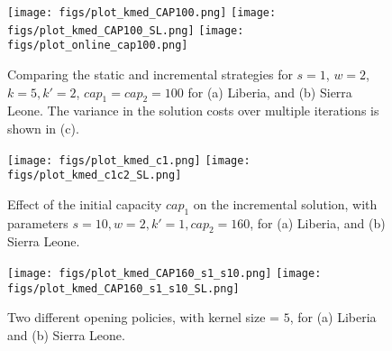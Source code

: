 \begin{figure}[h]
  \centering %
    \texttt{[image: figs/plot\_kmed\_CAP100.png]}
    \texttt{[image: figs/plot\_kmed\_CAP100\_SL.png]}
    \texttt{[image: figs/plot\_online\_cap100.png]}
    \caption{Comparing the static and incremental strategies for
$s=1$, $w=2$, $k=5, k' = 2$, $cap_1 = cap_2 = 100$ for
(a) Liberia, and (b) Sierra Leone.
The variance in the solution costs over multiple iterations is shown in (c).}
\label{fig:online1}
\end{figure}

\begin{figure}[h]
  \centering %
    \texttt{[image: figs/plot\_kmed\_c1.png]}
    \texttt{[image: figs/plot\_kmed\_c1c2\_SL.png]}
    \caption{Effect of the initial capacity $cap_1$ on the incremental solution, with
parameters $s = 10, w = 2, k' = 1, cap_2 = 160$, for (a) Liberia, and (b) Sierra Leone.}
\label{fig:online2}
\end{figure}

\begin{figure}[h]
  \centering %
    \texttt{[image: figs/plot\_kmed\_CAP160\_s1\_s10.png]}
    \texttt{[image: figs/plot\_kmed\_CAP160\_s1\_s10\_SL.png]}
    \caption{Two different opening policies, with kernel size = $5$, for
(a) Liberia and (b) Sierra Leone.}
\label{fig:online3}
\end{figure}


